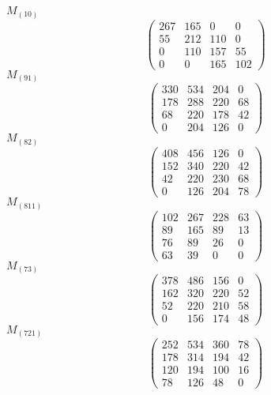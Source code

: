 \documentclass[12pt,reqno]{amsart}
\begin{document}
\Large
$M_{(10)}$                             $$ \begin{pmatrix} 
                         267 & 165 & 0 & 0 \\[6pt]
                        55 & 212 & 110 & 0 \\[6pt]
                        0 & 110 & 157 & 55 \\[6pt]
                           0 & 0 & 165 & 102
                              \end{pmatrix} $$ 
$M_{(91)}$                             $$ \begin{pmatrix} 
                        330 & 534 & 204 & 0 \\[6pt]
                       178 & 288 & 220 & 68 \\[6pt]
                        68 & 220 & 178 & 42 \\[6pt]
                           0 & 204 & 126 & 0
                              \end{pmatrix} $$ 
$M_{(82)}$                             $$ \begin{pmatrix} 
                        408 & 456 & 126 & 0 \\[6pt]
                       152 & 340 & 220 & 42 \\[6pt]
                        42 & 220 & 230 & 68 \\[6pt]
                          0 & 126 & 204 & 78
                              \end{pmatrix} $$ 
$M_{(811)}$                             $$ \begin{pmatrix} 
                       102 & 267 & 228 & 63 \\[6pt]
                        89 & 165 & 89 & 13 \\[6pt]
                         76 & 89 & 26 & 0 \\[6pt]
                            63 & 39 & 0 & 0
                              \end{pmatrix} $$ 
$M_{(73)}$                             $$ \begin{pmatrix} 
                        378 & 486 & 156 & 0 \\[6pt]
                       162 & 320 & 220 & 52 \\[6pt]
                        52 & 220 & 210 & 58 \\[6pt]
                          0 & 156 & 174 & 48
                              \end{pmatrix} $$ 
$M_{(721)}$                             $$ \begin{pmatrix} 
                       252 & 534 & 360 & 78 \\[6pt]
                       178 & 314 & 194 & 42 \\[6pt]
                       120 & 194 & 100 & 16 \\[6pt]
                           78 & 126 & 48 & 0
                              \end{pmatrix} $$ 
\end{document}
